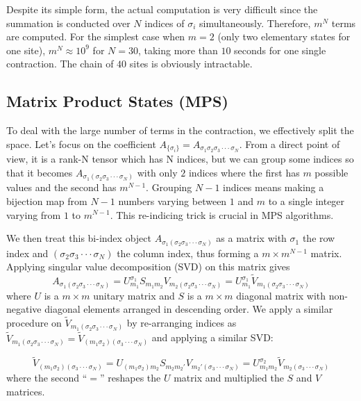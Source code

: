 \documentclass[english]{article}
\begin{document}
Despite its simple form, the actual computation is very difficult since
the summation is conducted over $N$ indices of $\sigma_{i}$
simultaneously. Therefore, $m^{N}$ terms are computed. For the simplest case when
$m=2$ (only two elementary states for one site), $m^{N}\approx10^{9}$
for $N=30$, taking more than $10$ seconds for one single contraction.
The chain of $40$ sites is obviously intractable.


\subsection{Matrix Product States (MPS)}

To deal with the large number of terms in the contraction, we effectively split the space. Let's focus on the coefficient $A_{\{\sigma_{i}\}}=A_{\sigma_{1}\sigma_{2}\sigma_{3}\cdot\cdot\cdot\sigma_{N}}$.
From a direct point of view, it is a rank-N tensor which has N indices,
but we can group some indices so that it becomes $A_{\sigma_{1}(\sigma_{2}\sigma_{3}\cdot\cdot\cdot\sigma_{N})}$
with only $2$ indices where the first has $m$ possible values and
the second has $m^{N-1}$. Grouping $N-1$ indices means making a
bijection map from $N-1$ numbers varying between $1$ and $m$ to
a single integer varying from $1$ to $m^{N-1}$. This re-indicing
trick is crucial in MPS algorithms.

We then treat this bi-index object $A_{\sigma_{1}(\sigma_{2}\sigma_{3}\cdot\cdot\cdot\sigma_{N})}$
as a matrix with $\sigma_{1}$ the row index and $(\sigma_{2}\sigma_{3}\cdot\cdot\cdot\sigma_{N})$
the column index, thus forming a $m\times m^{N-1}$ matrix. Applying
singular value decomposition (SVD) on this matrix gives 
\[
A_{\sigma_{1}(\sigma_{2}\sigma_{3}\cdot\cdot\cdot\sigma_{N})}=U_{m_{1}}^{\sigma_{1}}S_{m_{1}m_{2}}V_{m_{2}(\sigma_{2}\sigma_{3}\cdot\cdot\cdot\sigma_{N})}=U_{m_{1}}^{\sigma_{1}}\tilde{V}_{m_{1}(\sigma_{2}\sigma_{3}\cdot\cdot\cdot\sigma_{N})}
\]
where $U$ is a $m\times m$ unitary matrix and $S$ is a $m\times m$
diagonal matrix with non-negative diagonal elements arranged in descending
order. We apply a similar procedure on $\tilde{V}_{m_{1}(\sigma_{2}\sigma_{3}\cdot\cdot\cdot\sigma_{N})}$
by re-arranging indices as $\tilde{V}_{m_{1}(\sigma_{2}\sigma_{3}\cdot\cdot\cdot\sigma_{N})}=\tilde{V}_{(m_{1}\sigma_{2})(\sigma_{3}\cdot\cdot\cdot\sigma_{N})}$
and applying a similar SVD:

\[
\tilde{V}_{(m_{1}\sigma_{2})(\sigma_{3}\cdot\cdot\cdot\sigma_{N})}=U_{(m_{1}\sigma_{2})m_{2}}S_{m_{2}m_{2}'}V_{m_{2}'(\sigma_{3}\cdot\cdot\cdot\sigma_{N})}=U_{m_{1}m_{2}}^{\sigma_{2}}\tilde{V}_{m_{2}(\sigma_{3}\cdot\cdot\cdot\sigma_{N})}
\]
where the second ``$=$'' reshapes the $U$ matrix and multiplied
the $S$ and $V$ matrices. 
\end{document}
